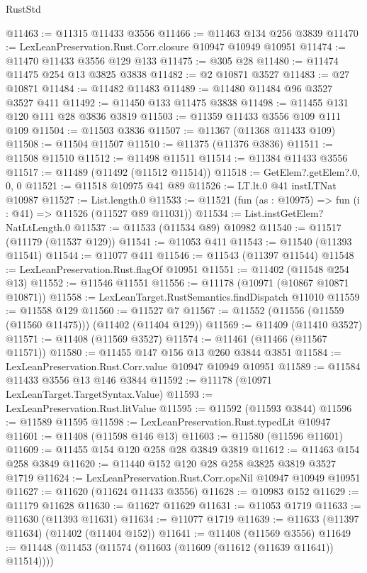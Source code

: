 \begin{lexlean}{RustStd}
\begin{coremodule}
@11463 := @11315 @11433 @3556
@11466 := @11463 @134 @256 @3839
@11470 := LexLeanPreservation.Rust.Corr.closure @10947 @10949 @10951
@11474 := @11470 @11433 @3556 @129 @133
@11475 := @305 @28
@11480 := @11474 @11475 @254 @13 @3825 @3838
@11482 := @2 @10871 @3527
@11483 := @27 @10871
@11484 := @11482 @11483
@11489 := @11480 @11484 @96 @3527 @3527 @411
@11492 := @11450 @133 @11475 @3838
@11498 := @11455 @131 @120 @111 @28 @3836 @3819
@11503 := @11359 @11433 @3556 @109 @111 @109
@11504 := @11503 @3836
@11507 := @11367 (@11368 @11433 @109)
@11508 := @11504 @11507
@11510 := @11375 (@11376 @3836)
@11511 := @11508 @11510
@11512 := @11498 @11511
@11514 := @11384 @11433 @3556
@11517 := @11489 (@11492 (@11512 @11514))
@11518 := GetElem?.getElem?.{0, 0, 0}
@11521 := @11518 @10975 @41 @89
@11526 := LT.lt.{0} @41 instLTNat @10987
@11527 := List.length.{0}
@11533 := @11521 (fun (as : @10975) => fun (i : @41) => @11526 (@11527 @89 @11031))
@11534 := List.instGetElem?NatLtLength.{0}
@11537 := @11533 (@11534 @89) @10982
@11540 := @11517 (@11179 (@11537 @129))
@11541 := @11053 @411
@11543 := @11540 (@11393 @11541)
@11544 := @11077 @411
@11546 := @11543 (@11397 @11544)
@11548 := LexLeanPreservation.Rust.flagOf @10951
@11551 := @11402 (@11548 @254 @13)
@11552 := @11546 @11551
@11556 := @11178 (@10971 (@10867 @10871 @10871))
@11558 := LexLeanTarget.RustSemantics.findDispatch @11010
@11559 := @11558 @129
@11560 := @11527 @7
@11567 := @11552 (@11556 (@11559 (@11560 @11475))) (@11402 (@11404 @129))
@11569 := @11409 (@11410 @3527)
@11571 := @11408 (@11569 @3527)
@11574 := @11461 (@11466 (@11567 @11571))
@11580 := @11455 @147 @156 @13 @260 @3844 @3851
@11584 := LexLeanPreservation.Rust.Corr.value @10947 @10949 @10951
@11589 := @11584 @11433 @3556 @13 @146 @3844
@11592 := @11178 (@10971 LexLeanTarget.TargetSyntax.Value)
@11593 := LexLeanPreservation.Rust.litValue
@11595 := @11592 (@11593 @3844)
@11596 := @11589 @11595
@11598 := LexLeanPreservation.Rust.typedLit @10947
@11601 := @11408 (@11598 @146 @13)
@11603 := @11580 (@11596 @11601)
@11609 := @11455 @154 @120 @258 @28 @3849 @3819
@11612 := @11463 @154 @258 @3849
@11620 := @11440 @152 @120 @28 @258 @3825 @3819 @3527 @1719
@11624 := LexLeanPreservation.Rust.Corr.opsNil @10947 @10949 @10951
@11627 := @11620 (@11624 @11433 @3556)
@11628 := @10983 @152
@11629 := @11179 @11628
@11630 := @11627 @11629
@11631 := @11053 @1719
@11633 := @11630 (@11393 @11631)
@11634 := @11077 @1719
@11639 := @11633 (@11397 @11634) (@11402 (@11404 @152))
@11641 := @11408 (@11569 @3556)
@11649 := @11448 (@11453 (@11574 (@11603 (@11609 (@11612 (@11639 @11641)) @11514))))

\end{coremodule}
\end{lexlean}
